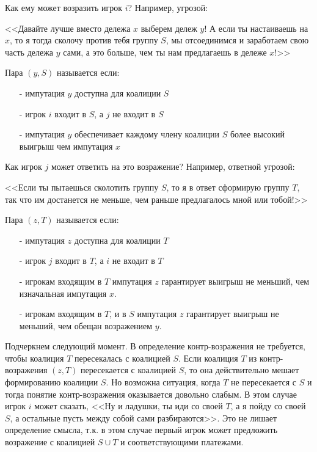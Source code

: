 Как ему может возразить игрок $i$? Например, угрозой:

<<Давайте лучше вместо дележа $x$ выберем дележ $y$! А если ты настаиваешь на $x$, то я тогда сколочу против тебя группу $S$, мы отсоединимся и заработаем свою часть дележа $y$ сами, а это больше, чем ты нам предлагаешь в дележе $x$!>>

\begin{mydef}
Пара $(y,S)$ называется  если:
\begin{itemize}
\item[-] импутация $y$ доступна для коалиции $S$
\item[-] игрок $i$ входит в $S$, а $j$ не входит в $S$
\item[-] импутация $y$ обеспечивает каждому члену коалиции $S$ более высокий выигрыш чем импутация $x$
\end{itemize}
\end{mydef}

Как игрок $j$ может ответить на это возражение? Например, ответной угрозой: 

<<Если ты пытаешься сколотить группу $S$, то я в ответ сформирую группу $T$, так что им достанется не меньше, чем раньше предлагалось мной или тобой!>>

\begin{mydef}
Пара $(z,T)$ называется  если:

\begin{itemize}
\item[-] импутация $z$ доступна для коалиции $T$
\item[-] игрок $j$ входит в $T$, а $i$ не входит в $T$
\item[-] игрокам входящим в $T$ импутация $z$ гарантирует выигрыш не меньший, чем изначальная импутация $x$.
\item[-] игрокам входящим в $T$, и в $S$ импутация $z$ гарантирует выигрыш не меньший, чем обещан возражением $y$.
\end{itemize}
\end{mydef}

Подчеркнем следующий момент. В определение контр-возражения не требуется, чтобы коалиция $T$ пересекалась с коалицией $S$. Если коалиция $T$ из контр-возражения $(z,T)$ пересекается с коалицией $S$, то она действительно мешает формированию коалиции $S$. Но возможна ситуация, когда $T$ не пересекается с $S$ и тогда понятие контр-возражения оказывается довольно слабым. В этом случае игрок $i$ может сказать, <<Ну и ладушки, ты иди со своей $T$, а я пойду со своей $S$, а остальные пусть между собой сами разбираются>>. Это не лишает определение смысла, т.к. в этом случае первый игрок может предложить возражение с коалицией $S\cup T$ и соответствующими платежами.

